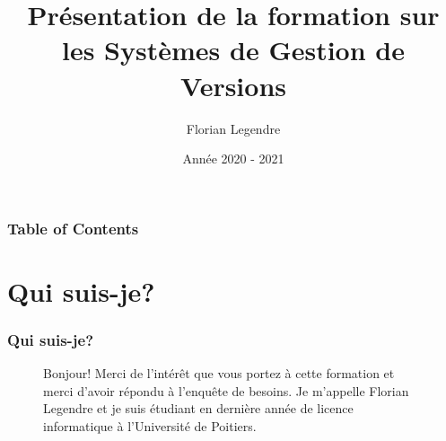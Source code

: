 \documentclass{beamer}
\title[Présentation de la formation]{Présentation de la formation sur les Systèmes de Gestion de Versions}
\author{Florian Legendre}
\institute{Université de Poitiers}
\date{Année 2020 - 2021}
\begin{document}
\frame{\titlepage}

\begin{frame}
\frametitle{Table of Contents}
\tableofcontents[hideallsubsections]
\end{frame}


\section{Qui suis-je?}

\begin{frame}
\frametitle{Qui suis-je?}
\begin{figure}[!htb]
        \begin{minipage}{0.65\textwidth}
            \begin{flushleft}
                Bonjour! Merci de l'intérêt que vous portez à cette formation et merci d'avoir répondu à l'enquête de besoins. Je m'appelle Florian Legendre et je suis étudiant en dernière année de licence informatique à l'Université de Poitiers.\\
                \medskip
                

\end{flushleft}
\end{minipage}
\end{figure}
\end{frame}
\end{document}

